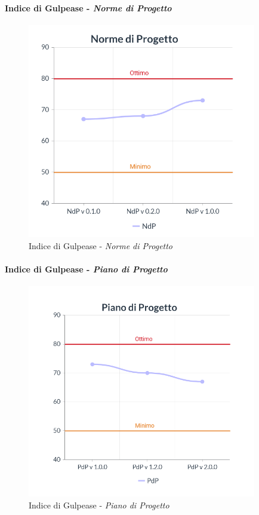 \paragraph{Indice di Gulpease - \textit{Norme di Progetto}}
\begin{center}
\begin{figure}[H]
  \centering
  \renewcommand{\thefigure}{9}
  \includegraphics[width=10cm]{./res/images/NdPGraph.png}
  \caption{Indice di Gulpease - \textit{Norme di Progetto}}
  \label{fig:Indice di Gulpease - Norme di Progetto}
\end{figure}
\end{center}
\pagebreak
\paragraph{Indice di Gulpease - \textit{Piano di Progetto}}
\begin{center}
\begin{figure}[H]
  \centering
  \renewcommand{\thefigure}{10}
  \includegraphics[width=10cm]{./res/images/PdPGraph.png}
  \caption{Indice di Gulpease - \textit{Piano di Progetto}}
  \label{fig:Indice di Gulpease - Piano di Progetto}
\end{figure}
\end{center}
\pagebreak
